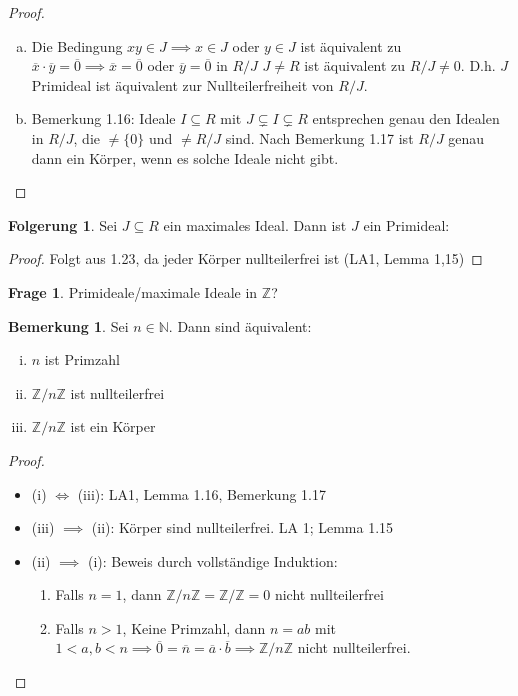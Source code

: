 \documentclass[a4paper, titlepage]{article}
\theoremstyle{definition}
\newtheorem{bem}[satz]{Bemerkung}
\newtheorem*{fg}{Folgerung}
\newtheorem*{frage}{Frage}
\newcommand{\N}{\mathbb{N}}
\newcommand{\Z}{\mathbb{Z}}
\begin{document}
	\begin{proof}
		\begin{enumerate}[(a)]
			\item Die Bedingung $xy \in J \implies x\in J$ oder $y\in J$ ist äquivalent zu $\overline{x}\cdot\overline{y}=\overline{0}\implies \overline{x}=\overline{0}$ oder $\overline{y}=\overline{0}$ in $R/J$ $J\neq R$ ist äquivalent zu $R/J\neq 0$. D.h. $J$ Primideal ist äquivalent zur Nullteilerfreiheit von $R/J$.
			\item Bemerkung 1.16: Ideale $I\subseteq R$ mit $J\subsetneq I \subsetneq R$ entsprechen genau den Idealen in $R/J$, die $\neq \{0\}$ und $\neq R/J$ sind. Nach Bemerkung 1.17 ist $R/J$ genau dann ein Körper, wenn es solche Ideale nicht gibt.
		\end{enumerate}
    \end{proof}
\begin{fg}
Sei $J\subseteq R$ ein maximales Ideal. Dann ist $J$ ein Primideal:
\end{fg}
	\begin{proof} 
		Folgt aus 1.23, da jeder Körper nullteilerfrei ist (LA1, Lemma 1,15)
    \end{proof}
    \begin{frage}
 Primideale/maximale Ideale in $\Z$?
    \end{frage}
\begin{bem}
	Sei $n\in \N$. Dann sind äquivalent:
	\begin{enumerate}[(i)]
		\item $n$ ist Primzahl
		\item $\Z/n\Z$ ist nullteilerfrei
		\item $\Z/n\Z$ ist ein Körper
	\end{enumerate}
\end{bem}
\newpage
\begin{proof}
	\begin{itemize}
		\item (i) $\Leftrightarrow$ (iii): LA1, Lemma 1.16, Bemerkung 1.17
		\item (iii) $\implies$ (ii): Körper sind nullteilerfrei. LA 1; Lemma 1.15
		\item (ii) $\implies$ (i): Beweis durch vollständige Induktion:
		\begin{enumerate}
			\item Falls $n=1$, dann $\Z/n\Z=\Z/\Z=0$ nicht nullteilerfrei
			\item Falls $n>1$, Keine Primzahl, dann $n=ab$ mit $1<a,b<n	\implies \overline{0}=\overline{n}=\overline{a}\cdot\overline{b}\implies \Z/n\Z$ nicht nullteilerfrei.
		\end{enumerate}
	\end{itemize}
\end{proof}
\end{document}
